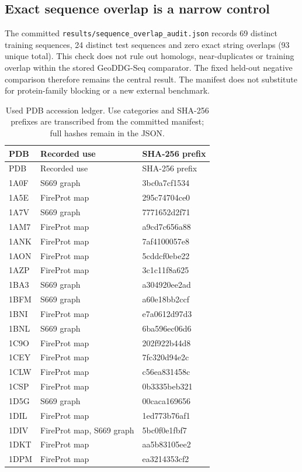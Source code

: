 \subsection{Exact sequence overlap is a narrow control}
The committed \texttt{results/sequence\_overlap\_audit.json} records 69 distinct training sequences, 24 distinct test sequences and zero exact string overlaps (93 unique total). This check does not rule out homologs, near-duplicates or training overlap within the stored GeoDDG-Seq comparator. The fixed held-out negative comparison therefore remains the central result. The manifest does not substitute for protein-family blocking or a new external benchmark.
\begin{longtable}{lll}
\caption{Used PDB accession ledger. Use categories and SHA-256 prefixes are transcribed from the committed manifest; full hashes remain in the JSON.}\\
\hline PDB & Recorded use & SHA-256 prefix\\\hline\endfirsthead
\hline PDB & Recorded use & SHA-256 prefix\\\hline\endhead
1A0F & S669 graph & 3bc0a7cf1534\\
1A5E & FireProt map & 295c74704ce0\\
1A7V & S669 graph & 7771652d2f71\\
1AM7 & FireProt map & a9cd7c656a88\\
1ANK & FireProt map & 7af4100057e8\\
1AON & FireProt map & 5cddcf0ebe22\\
1AZP & FireProt map & 3c1c11f8a625\\
1BA3 & S669 graph & a304920ee2ad\\
1BFM & S669 graph & a60e18bb2ccf\\
1BNI & FireProt map & e7a0612d97d3\\
1BNL & S669 graph & 6ba596ec06d6\\
1C9O & FireProt map & 202f922b44d8\\
1CEY & FireProt map & 7fc320d94e2c\\
1CLW & FireProt map & c56ea831458c\\
1CSP & FireProt map & 0b3335beb321\\
1D5G & S669 graph & 00caca169656\\
1DIL & FireProt map & 1ed773b76af1\\
1DIV & FireProt map, S669 graph & 5bc0f0e1fbf7\\
1DKT & FireProt map & aa5b83105ee2\\
1DPM & FireProt map & ea3214353cf2\\

\end{longtable}
